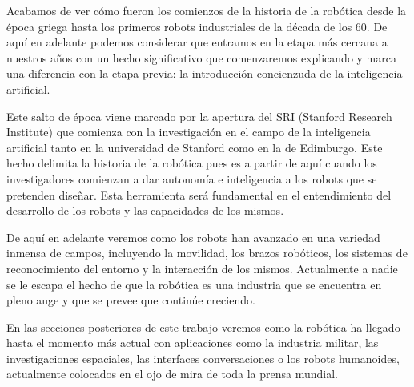 Acabamos de ver cómo fueron los comienzos de la historia de la robótica desde la época griega hasta los primeros robots industriales de la década de los 60. De aquí en adelante podemos considerar que entramos en la etapa más cercana a nuestros años con un hecho significativo que comenzaremos explicando y marca una diferencia con la etapa previa: la introducción concienzuda de la inteligencia artificial.

\vspace{10px}

Este salto de época viene marcado por la apertura del SRI (Stanford Research Institute) que comienza con la investigación en el campo de la inteligencia artificial tanto en la universidad de Stanford como en la de Edimburgo. Este hecho delimita la historia de la robótica pues es a partir de aquí cuando los investigadores comienzan a dar autonomía e inteligencia a los robots que se pretenden diseñar. Esta herramienta será fundamental en el entendimiento del desarrollo de los robots y las capacidades de los mismos.

\vspace{10px}

De aquí en adelante veremos como los robots han avanzado en una variedad inmensa de campos, incluyendo la movilidad, los brazos robóticos, los sistemas de reconocimiento del entorno y la interacción de los mismos. Actualmente a nadie se le escapa el hecho de que la robótica es una industria que se encuentra en pleno auge y que se prevee que continúe creciendo.

\vspace{10px}

En las secciones posteriores de este trabajo veremos como la robótica ha llegado hasta el momento más actual con aplicaciones como la industria militar, las investigaciones espaciales, las interfaces conversaciones o los robots humanoides, actualmente colocados en el ojo de mira de toda la prensa mundial.
